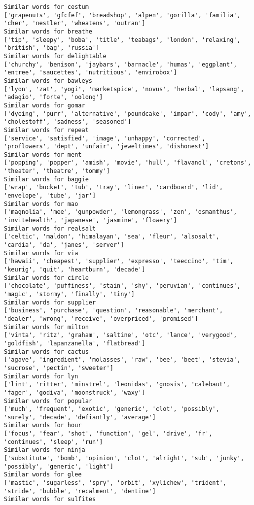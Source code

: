 \documentclass[11pt]{article}
\begin{document}
\begin{Verbatim}[commandchars=\\\{\}]
Similar words for cestum
['grapenuts', 'gfcfef', 'breadshop', 'alpen', 'gorilla', 'familia', 'cher', 'nestler', 'wheatens', 'outran']
Similar words for breathe
['tip', 'sleepy', 'boba', 'title', 'teabags', 'london', 'relaxing', 'british', 'bag', 'russia']
Similar words for delightable
['churchy', 'benison', 'jaybars', 'barnacle', 'humas', 'eggplant', 'entree', 'saucettes', 'nutritious', 'envirobox']
Similar words for bawleys
['lyon', 'zat', 'yogi', 'marketspice', 'novus', 'herbal', 'lapsang', 'adagio', 'forte', 'oolong']
Similar words for gomar
['dyeing', 'purr', 'alternative', 'poundcake', 'impar', 'cody', 'amy', 'cholestoff', 'sadness', 'seasoned']
Similar words for repeat
['service', 'satisfied', 'image', 'unhappy', 'corrected', 'proflowers', 'dept', 'unfair', 'jeweltimes', 'dishonest']
Similar words for ment
['popping', 'popper', 'amish', 'movie', 'hull', 'flavanol', 'cretons', 'theater', 'theatre', 'tommy']
Similar words for baggie
['wrap', 'bucket', 'tub', 'tray', 'liner', 'cardboard', 'lid', 'envelope', 'tube', 'jar']
Similar words for mao
['magnolia', 'mee', 'gunpowder', 'lemongrass', 'zen', 'osmanthus', 'invitehealth', 'japanese', 'jasmine', 'flowery']
Similar words for realsalt
['celtic', 'maldon', 'himalayan', 'sea', 'fleur', 'alsosalt', 'cardia', 'da', 'janes', 'server']
Similar words for via
['hawaii', 'cheapest', 'supplier', 'expresso', 'teeccino', 'tim', 'keurig', 'quit', 'heartburn', 'decade']
Similar words for circle
['chocolate', 'puffiness', 'stain', 'shy', 'peruvian', 'continues', 'magic', 'stormy', 'finally', 'tiny']
Similar words for supplier
['business', 'purchase', 'question', 'reasonable', 'merchant', 'dealer', 'wrong', 'receive', 'overpriced', 'promised']
Similar words for milton
['vinta', 'ritz', 'graham', 'saltine', 'otc', 'lance', 'verygood', 'goldfish', 'lapanzanella', 'flatbread']
Similar words for cactus
['agave', 'ingredient', 'molasses', 'raw', 'bee', 'beet', 'stevia', 'sucrose', 'pectin', 'sweeter']
Similar words for lyn
['lint', 'ritter', 'minstrel', 'leonidas', 'gnosis', 'calebaut', 'fager', 'godiva', 'moonstruck', 'waxy']
Similar words for popular
['much', 'frequent', 'exotic', 'generic', 'clot', 'possibly', 'surely', 'decade', 'defiantly', 'average']
Similar words for hour
['focus', 'fear', 'shot', 'function', 'gel', 'drive', 'fr', 'continues', 'sleep', 'run']
Similar words for ninja
['substitute', 'bomb', 'opinion', 'clot', 'alright', 'sub', 'junky', 'possibly', 'generic', 'light']
Similar words for glee
['mastic', 'sugarless', 'spry', 'orbit', 'xylichew', 'trident', 'stride', 'bubble', 'recalment', 'dentine']
Similar words for sulfites

\end{Verbatim}
\end{document}
